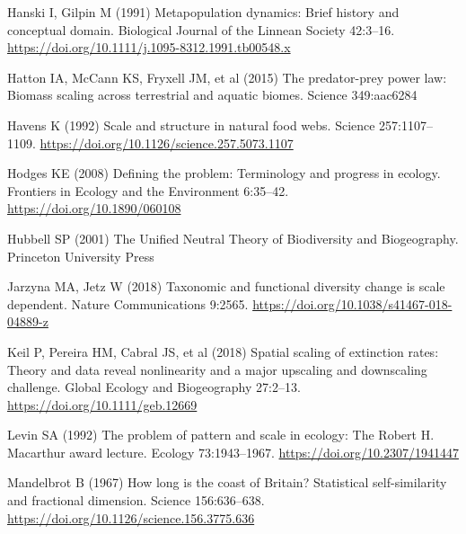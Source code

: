 \documentclass[
  12pt,
]{article}
\newlength{\cslhangindent}
\newlength{\cslentryspacingunit} %
\newenvironment{CSLReferences}[2] %
 {%
  \setlength{\parindent}{0pt}
  \ifodd #1
  \let\oldpar\par
  \def\par{\hangindent=\cslhangindent\oldpar}
  \fi
  \setlength{\parskip}{#2\cslentryspacingunit}
 }%
 {}
\begin{document}
\begin{CSLReferences}{1}{0}
\leavevmode{}%
Hanski I, Gilpin M (1991) Metapopulation dynamics: Brief history and conceptual domain. Biological Journal of the Linnean Society 42:3--16. \url{https://doi.org/10.1111/j.1095-8312.1991.tb00548.x}

\leavevmode{}%
Hatton IA, McCann KS, Fryxell JM, et al (2015) The predator-prey power law: {Biomass} scaling across terrestrial and aquatic biomes. Science 349:aac6284

\leavevmode{}%
Havens K (1992) Scale and structure in natural food webs. Science 257:1107--1109. \url{https://doi.org/10.1126/science.257.5073.1107}

\leavevmode{}%
Hodges KE (2008) Defining the problem: Terminology and progress in ecology. Frontiers in Ecology and the Environment 6:35--42. \url{https://doi.org/10.1890/060108}

\leavevmode{}%
Hubbell SP (2001) The {Unified Neutral Theory} of {Biodiversity} and {Biogeography}. {Princeton University Press}

\leavevmode{}%
Jarzyna MA, Jetz W (2018) Taxonomic and functional diversity change is scale dependent. Nature Communications 9:2565. \url{https://doi.org/10.1038/s41467-018-04889-z}

\leavevmode{}%
Keil P, Pereira HM, Cabral JS, et al (2018) Spatial scaling of extinction rates: {Theory} and data reveal nonlinearity and a major upscaling and downscaling challenge. Global Ecology and Biogeography 27:2--13. \url{https://doi.org/10.1111/geb.12669}

\leavevmode{}%
Levin SA (1992) The problem of pattern and scale in ecology: The {Robert H}. {Macarthur} award lecture. Ecology 73:1943--1967. \url{https://doi.org/10.2307/1941447}

\leavevmode{}%
Mandelbrot B (1967) How long is the coast of {Britain}? {Statistical} self-similarity and fractional dimension. Science 156:636--638. \url{https://doi.org/10.1126/science.156.3775.636}


\end{CSLReferences}
\end{document}
